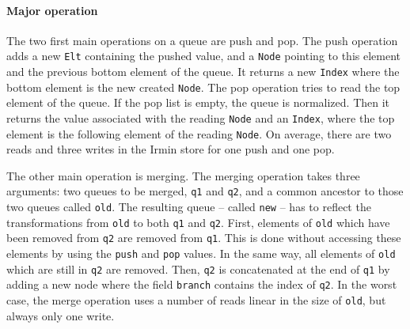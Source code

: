 \documentclass{article}
\newcommand{\irmin}{Irmin\xspace}
\newcommand{\code}[1]{\texttt{#1}}
\begin{document}
\paragraph{Major operation}
The two first main operations on a queue are push and pop.
The push operation adds a new \code{Elt} containing the pushed value, and a \code{Node} pointing to this element and the previous bottom element of the queue.
It returns a new \code{Index} where the bottom element is the new created \code{Node}.
The pop operation tries to read the top element of the queue.
If the pop list is empty, the queue is normalized.
Then it returns the value associated with the reading \code{Node} and an \code{Index}, where the top element is the following element of the reading \code{Node}.
On average, there are two reads and three writes in the \irmin store for one push and one pop.

The other main operation is merging.
The merging operation takes three arguments: two queues to be merged, \code{q1} and \code{q2}, and a common ancestor to those two queues called \code{old}.
The resulting queue -- called \code{new} -- has to reflect the transformations from \code{old} to both \code{q1} and \code{q2}.
First, elements of \code{old} which have been removed from \code{q2} are removed from \code{q1}.
This is done without accessing these elements by using the \code{push} and \code{pop} values.
In the same way, all elements of \code{old} which are still in \code{q2} are removed.
Then, \code{q2} is concatenated at the end of \code{q1} by adding a new node where the field \code{branch} contains the index of \code{q2}.
In the worst case, the merge operation uses a number of reads linear in the size of \code{old}, but always only one write.
\end{document}
